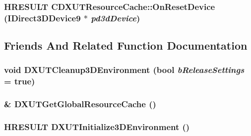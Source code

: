 \label{class_c_d_x_u_t_resource_cache_abaf5192e33946915a9d1a3098ffdd17a}
\hypertarget{class_c_d_x_u_t_resource_cache_a10f3f5f8c73a0c64cb64e9647a1e3735}{
\subsubsection[{OnResetDevice}]{\setlength{\rightskip}{0pt plus 5cm}HRESULT CDXUTResourceCache::OnResetDevice (IDirect3DDevice9 $\ast$ {\em pd3dDevice})}}
\label{class_c_d_x_u_t_resource_cache_a10f3f5f8c73a0c64cb64e9647a1e3735}


\subsection{Friends And Related Function Documentation}
\hypertarget{class_c_d_x_u_t_resource_cache_af3c5bc0824d1e05bc4c3a5190896a259}{
\subsubsection[{DXUTCleanup3DEnvironment}]{\setlength{\rightskip}{0pt plus 5cm}void DXUTCleanup3DEnvironment (bool {\em bReleaseSettings} = {\ttfamily true})}}
\label{class_c_d_x_u_t_resource_cache_af3c5bc0824d1e05bc4c3a5190896a259}
\hypertarget{class_c_d_x_u_t_resource_cache_aa4ef62fbd7e1e944b3aea0f090f3de5f}{
\subsubsection[{DXUTGetGlobalResourceCache}]{\& DXUTGetGlobalResourceCache ()}}
\label{class_c_d_x_u_t_resource_cache_aa4ef62fbd7e1e944b3aea0f090f3de5f}
\hypertarget{class_c_d_x_u_t_resource_cache_a3b09c83d5019bcc724c80b297c581f90}{
\subsubsection[{DXUTInitialize3DEnvironment}]{\setlength{\rightskip}{0pt plus 5cm}HRESULT DXUTInitialize3DEnvironment ()}}
